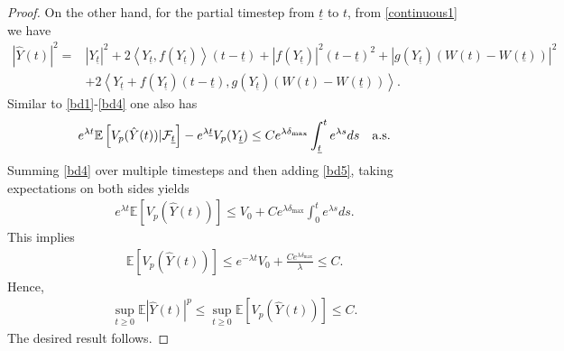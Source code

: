 \documentclass[preprint,12pt,compress]{elsarticle}
\begin{document}
\begin{proof}
On the other hand, for the partial timestep from $\underline{t}$ to $t$, from \eqref{continuous1} we have
\begin{equation*}
	\begin{split}
		{| {{\hat Y}(t)} |^2} =& {\left| {{Y_{\underline{t}}}} \right|^2} + 2\left\langle {{Y_{\underline{t}}},f({Y_{\underline{t}}})} \right\rangle (t - \underline{t}) + {\left| {f({Y_{\underline{t}}})} \right|^2}{(t - \underline{t})^2} + {\left| {g({Y_{\underline{t}}})\left( {W(t) - W(\underline{t})} \right)} \right|^2} \\
		&+ 2\left\langle {{Y_{\underline{t}}} + f({Y_{\underline{t}}})(t - \underline{t}),g({Y_{\underline{t}}})(W(t) - W(\underline{t}))} \right\rangle  .
	\end{split}
\end{equation*}
Similar to \eqref{bd1}-\eqref{bd4} one also has
\begin{equation}  \label{bd5}
\begin{split}
	{e^{\lambda t}}\mathbb{E}\left[ {{{V_p(\hat Y(t))}}|{{\cal F}_{\underline{t}}}} \right] - {e^{\lambda \underline{t}}}V_p(Y_{\underline{t}}) 
	\le C{e^{\lambda {\delta _{\max }}}}\int_{\underline{t}}^t {{e^{\lambda s}}ds}  \quad \text{a.s.}
\end{split}
\end{equation}
Summing \eqref{bd4} over multiple timesteps and then adding \eqref{bd5}, taking expectations on both sides yields
\begin{equation*}
\begin{split}
	{e^{\lambda t}}\mathbb{E}\left[ V_p(\hat{Y}(t)) \right] \le V_0 + C{e^{\lambda {\delta _{\max }}}}\int_0^t {{e^{\lambda s}}ds} . 
\end{split}
\end{equation*}
This implies
\begin{equation}  \label{bd7}
\begin{split}
	\mathbb{E}\left[ V_p(\hat{Y}(t)) \right] \le {e^{ - \lambda t}}V_0 + \frac{{C{e^{\lambda {\delta _{\max }}}}}}{\lambda } \le C.
\end{split}
\end{equation}
Hence, 
\begin{equation*}
\begin{split}
	\mathop {\sup }\limits_{t \ge 0} \mathbb{E}{\left| {\hat Y(t)} \right|^p} \le \mathop {\sup }\limits_{t \ge 0} \mathbb{E}\left[ V_p(\hat{Y}(t)) \right] 
	\le C .
\end{split}
\end{equation*}
The desired result follows.

\end{proof}
\end{document}
